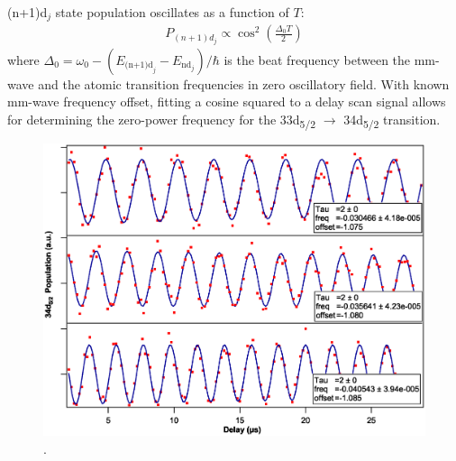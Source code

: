 \documentclass[landscape]{sciposter}
\begin{document}
\begin{multicols}{4}
(n+1)d$_j$ state population oscillates as a function of $T$: 
\begin{align*}
\boxed{P_{(n+1)d_j} \propto {\cos}^{2}\left(\frac{\Delta_{0} T}{2}\right)}
\end{align*}
where $\Delta_0=\omega_0-(E_{\text{(n+1)d}_j}-E_{\text{nd}_j})/\hbar$ is the beat frequency between the mm-wave and the atomic transition frequencies in zero oscillatory field. With known mm-wave frequency offset, fitting a cosine squared to a delay scan signal allows for determining the zero-power frequency for the 33d\textsubscript{5/2} $\rightarrow$ 34d\textsubscript{5/2} transition.

\begin{figure}
\includegraphics[scale = 1]{data68-67-69.eps}
\caption{.}
\label{Ramsey}
\end{figure}



\end{multicols}
\end{document}
